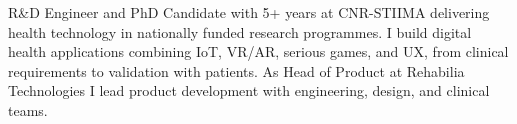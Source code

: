 {R\&D Engineer and PhD Candidate with 5+ years at CNR-STIIMA delivering health technology in nationally funded research programmes. I build digital health applications combining IoT, VR/AR, serious games, and UX, from clinical requirements to validation with patients. As Head of Product at Rehabilia Technologies I lead product development with engineering, design, and clinical teams.}

